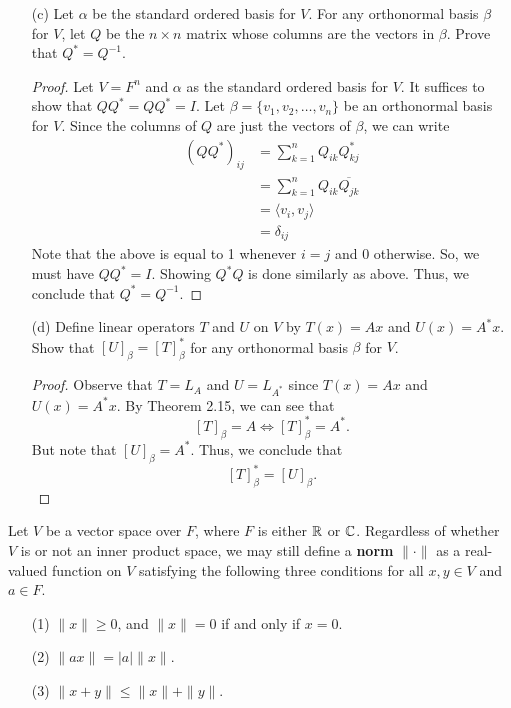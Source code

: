 \begin{enumerate}
\begin{proof}
        \end{proof}
    \item[(c)] Let \( \alpha  \) be the standard ordered basis for \( V  \). For any orthonormal basis \( \beta  \) for \( V  \), let \( Q  \) be the \( n \times n  \) matrix whose columns are the vectors in \( \beta  \). Prove that \( Q^{*} = Q^{-1}  \).
    \begin{proof}
       Let \( V = F^{n} \) and \( \alpha  \) as the standard ordered basis for \( V  \). It suffices to show that \( Q Q^{*} = Q Q^{*} = I  \). Let \( \beta = \{ {v}_{1}, {v}_{2}, \dots, {v}_{n} \}  \) be an orthonormal basis for \( V \). Since the columns of \( Q  \) are just the vectors of \( \beta \), we can write 
        \begin{align*}
            {(Q Q^{*})}_{ij} &= \sum_{ k=1  }^{ n } {Q}_{ik } Q^{*}_{kj} \\
                             &= \sum_{ k=1  }^{ n } {Q}_{ik } \overline{{Q}_{jk }} \\
                             &= \langle {v}_{i} ,  {v}_{j} \rangle \\
                             &= {\delta}_{ij}
        \end{align*}
        Note that the above is equal to 1 whenever \( i = j  \) and \( 0  \) otherwise. So, we must have \( Q Q^{*} = I   \). Showing \( Q^{*} Q  \) is done similarly as above. Thus, we conclude that \( Q^{*} = Q^{-1} \).
     \end{proof}

     \item[(d)] Define linear operators \( T  \) and \( U  \) on \( V  \) by \( T(x) = Ax  \) and \( U(x) = A^{*}x  \). Show that \( [U]_{\beta} = [T]^{*}_{\beta} \) for any orthonormal basis \( \beta  \) for \( V  \).
        \begin{proof}
        Observe that \( T = {L}_{A} \) and \( U = {L}_{A^{*}} \) since \( T(x) = Ax  \) and \( U(x) = A^{*}x \). By Theorem 2.15, we can see that 
        \[  [T]_{\beta} = A \iff [T]_{\beta}^{*} = A^{*}.   \]
        But note that \(  [U]_{\beta} = A^{*} \). Thus, we conclude that
        \[  [T]_{\beta}^{*} = [U]_{\beta}.\]
        \end{proof}
\end{enumerate}

\begin{definition}
    Let \( V  \) be a vector space over \( F  \), where \( F  \) is either \( \mathbb{R}  \) or \( \mathbb{C} \). Regardless of whether \( V  \) is or not an inner product space, we may still define a \textbf{norm} \( \|\cdot\| \) as a real-valued function on \( V  \) satisfying the following three conditions for all \( x,y \in V  \) and \( a \in F  \).
    \begin{enumerate}
        \item[(1)] \( \|x \| \geq 0  \), and \( \|x\| = 0  \) if and only if \( x = 0  \).
        \item[(2)] \( \|ax\| = | a | \|x\| \).
        \item[(3)] \( \|x + y\| \leq \|x\| + \|y\| \).
    \end{enumerate}
\end{definition}

